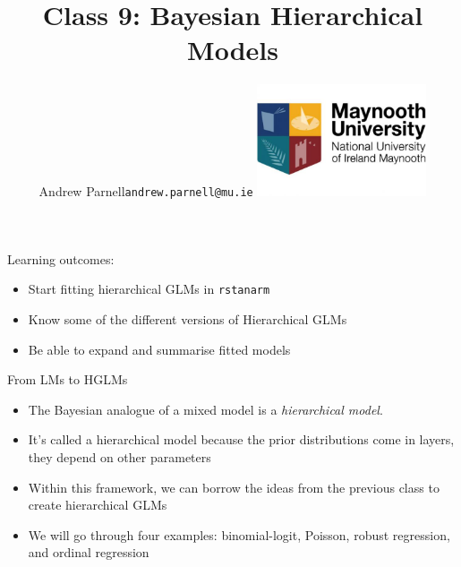 \documentclass[ignorenonframetext,]{beamer}
\title{Class 9: Bayesian Hierarchical Models}
\author{Andrew Parnell\newline \texttt{andrew.parnell@mu.ie}
\newline \vspace{1cm} \newline \includegraphics[width=5cm]{MU_logo.jpg}}
\date{}
\providecommand{\tightlist}{%
  \setlength{\itemsep}{0pt}\setlength{\parskip}{0pt}}
\begin{document}
\frame{\titlepage}

\begin{frame}[fragile]{Learning outcomes:}

\begin{itemize}
\tightlist
\item
  Start fitting hierarchical GLMs in \texttt{rstanarm}
\item
  Know some of the different versions of Hierarchical GLMs
\item
  Be able to expand and summarise fitted models
\end{itemize}

\end{frame}

\begin{frame}{From LMs to HGLMs}

\begin{itemize}
\tightlist
\item
  The Bayesian analogue of a mixed model is a \emph{hierarchical model}.
\item
  It's called a hierarchical model because the prior distributions come
  in layers, they depend on other parameters
\item
  Within this framework, we can borrow the ideas from the previous class
  to create hierarchical GLMs
\item
  We will go through four examples: binomial-logit, Poisson, robust
  regression, and ordinal regression
\end{itemize}

\end{frame}
\end{document}
